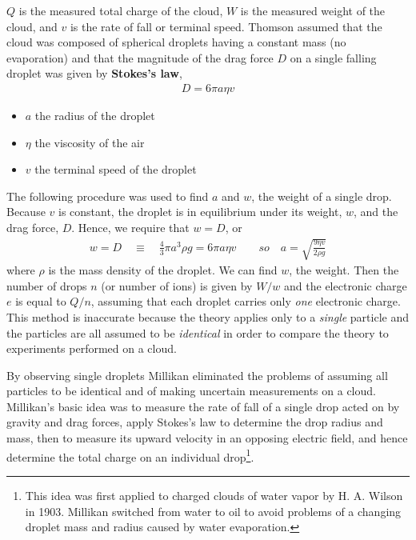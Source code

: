         $Q$ is the measured total charge of the cloud, $W$ is the measured weight of the cloud, and $v$ is the rate of fall or terminal 
        speed. Thomson assumed that the cloud was composed of spherical droplets having a constant mass (no evaporation) and that 
        the magnitude of the drag force $D$ on a single falling droplet was given by \textbf{Stokes’s law},
        \begin{align}
            \label{eq:Stokes's law}
            D = 6 \pi a \eta v
        \end{align}
        {\tiny \begin{itemize}
            \item $a$ the radius of the droplet
            \item $\eta$ the viscosity of the air
            \item $v$ the terminal speed of the droplet
        \end{itemize}}
        The following procedure was used to find $a$ and $w$, the weight of a single drop. Because $v$ is constant, the droplet is in 
        equilibrium under its weight, $w$, and the drag force, $D$. Hence, we require that $w = D$, or
        \begin{align}
            \label{eq:Stokes's law:1}
            w = D \quad \equiv \quad \frac{4}{3} \pi a^3  \rho g = 6 \pi a \eta v 
            \qquad so \quad 
            a = \sqrt{\frac{9 \eta v}{2 \rho g}}
        \end{align}
        where $\rho$ is the mass density of the droplet. We can find $w$, the weight. 
        Then the number of drops $n$ (or number of ions) is given by $W/w$ and the electronic charge $e$ is equal to $Q/n$, 
        assuming that each droplet carries only \textit{one} electronic charge. This method is inaccurate because the 
        theory applies only to a \textit{single} particle and the particles are all assumed to be \textit{identical} in order to compare 
        the theory to experiments performed on a cloud.

        \bulletpar By observing single droplets Millikan eliminated the problems of assuming all particles to be identical and of making uncertain 
        measurements on a cloud. Millikan’s basic idea was to measure the rate of fall of a single drop acted on by gravity and drag forces, 
        apply Stokes’s law to determine the drop radius and mass, then to measure its upward velocity in an opposing electric field, and 
        hence determine the total charge on an individual drop\footnote{This idea was first applied to charged clouds of water vapor by 
        H. A. Wilson in 1903. Millikan switched from water to oil to avoid problems of a changing droplet mass and radius caused by water 
        evaporation.}.

